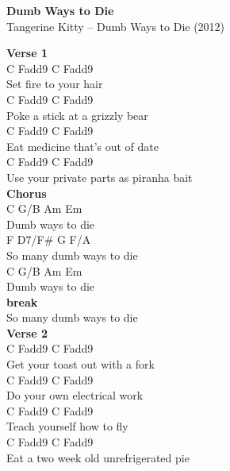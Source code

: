 \documentclass[a4paper]{article}
\begin{document}
    \begin{center}
        \textbf{Dumb Ways to Die}
        ~\\
        Tangerine Kitty -- Dumb Ways to Die (2012)
    \end{center}
    {
        \scriptsize
        \textbf{Verse 1}
        ~\\
        {
            \cutive
            \obeyspaces
    C    Fadd9   C    Fadd9
\\
Set fire to your hair
\\
       C          Fadd9   C    Fadd9
\\
Poke a stick at a grizzly bear
\\
    C               Fadd9  C    Fadd9
\\
Eat medicine that's out of date
\\
         C             Fadd9 C     Fadd9
\\
Use your private parts as  piranha bait
\\

        }
        \textbf{Chorus}
        ~\\
        {
            \cutive
            \obeyspaces
C    G/B     Am   Em
\\
Dumb ways to die
\\
   F         D7/F\#   G    F/A
\\
So many dumb ways to die
\\
C    G/B     Am   Em
\\
Dumb ways to die 
\\

        }
        \textbf{break}
        ~\\
        {
            \cutive
            \obeyspaces
So many dumb ways to die
\\

        }
        \textbf{Verse 2}
        ~\\
        {
            \cutive
            \obeyspaces
         C        Fadd9   C    Fadd9
\\
Get your toast out with a fork 
\\
        C    Fadd9     C    Fadd9
\\
Do your own electrical work
\\
C             Fadd9   C    Fadd9
\\
Teach yourself how to fly
\\
      C        Fadd9 C            Fadd9
\\
Eat a two week old unrefrigerated pie
\\

}}
\end{document}
